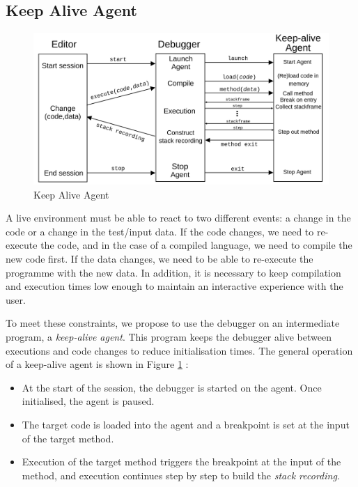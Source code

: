 \documentclass[english,submission]{programming}
\begin{document}
\subsection{Keep Alive Agent}

\begin{figure}[h]
  \centering
  \includegraphics[width=0.8\linewidth]{img/keepalive_agent.png}
  \caption{Keep Alive Agent}
  \label{fig:keepalive-agent}
\end{figure}

A live environment must be able to react to two different events: a change in the code or a change in the test/input data. 
If the code changes, we need to re-execute the code, and in the case of a compiled language, we need to compile the new code first. 
If the data changes, we need to be able to re-execute the programme with the new data. 
In addition, it is necessary to keep compilation and execution times low enough to maintain an interactive experience with the user.

To meet these constraints, we propose to use the debugger on an intermediate program, a \textit{keep-alive agent}. 
This program keeps the debugger alive between executions and code changes to reduce initialisation times. 
The general operation of a keep-alive agent is shown in Figure \ref{fig:keepalive-agent} :
\begin{itemize}
  \item At the start of the session, the debugger is started on the agent. Once initialised, the agent is paused.
  \item The target code is loaded into the agent and a breakpoint is set at the input of the target method.
  \item Execution of the target method triggers the breakpoint at the input of the method, and execution continues step by step to build the \textit{stack recording}.
\end{itemize}
\end{document}
